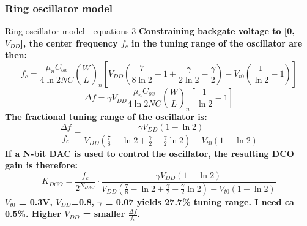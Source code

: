 \documentclass[t, screen, aspectratio=43]{beamer}
\begin{document}
\begin{frame}
	\frametitle{Ring oscillator model}
	\begin{block}{Ring oscillator model - equations 3}
	\scriptsize
		\tiny
		\textbf{Constraining backgate voltage to [0, $V_{DD}$], the center frequency $f_c$ in the tuning range of the oscillator are then:}
		\begin{equation}
			f_{c} = \frac{\mu_nC_{ox}}{4\ln2NC}\left(\frac{W}{L}\right)_n\left[V_{DD}\left(\frac{7}{8\ln2}-1+\frac{\gamma}{2\ln2}-\frac{\gamma}{2}\right)-V_{t0}\left(\frac{1}{\ln2}-1\right)\right]
		\end{equation}
		\begin{equation}
			\Delta f = \gamma V_{DD}\frac{\mu_nC_{ox}}{4\ln2NC}\left(\frac{W}{L}\right)_n\left[\frac{1}{\ln2}-1\right]
		\end{equation}
		\textbf{The fractional tuning range of the oscillator is:}
		\begin{equation}
			\frac{\Delta f}{f_c} = \frac{\gamma V_{DD}\left( 1-\ln2 \right)}{V_{DD}\left(\frac{7}{8}-\ln2+\frac{\gamma}{2}-\frac{\gamma}{2}\ln2\right)-V_{t0}\left(1-\ln2\right)}
		\end{equation}	
		\textbf{If a N-bit DAC is used to control the oscillator, the resulting DCO gain is therefore:}
		\begin{equation}
			K_{DCO} = \frac{f_c}{2^{N_{DAC}}}\cdot\frac{\gamma V_{DD}\left( 1-\ln2 \right)}{V_{DD}\left(\frac{7}{8}-\ln2+\frac{\gamma}{2}-\frac{\gamma}{2}\ln2\right)-V_{t0}\left(1-\ln2\right)}
		\end{equation}	
		\textbf{$V_{t0}$ = 0.3V, $V_{DD}$=0.8, $\gamma$ = 0.07 yields 27.7\% tuning range. 	I need ca 0.5\%. Higher $V_{DD}$ = smaller $\frac{\Delta f}{f_c}$.}
	\end{block}
\end{frame}
\end{document}
